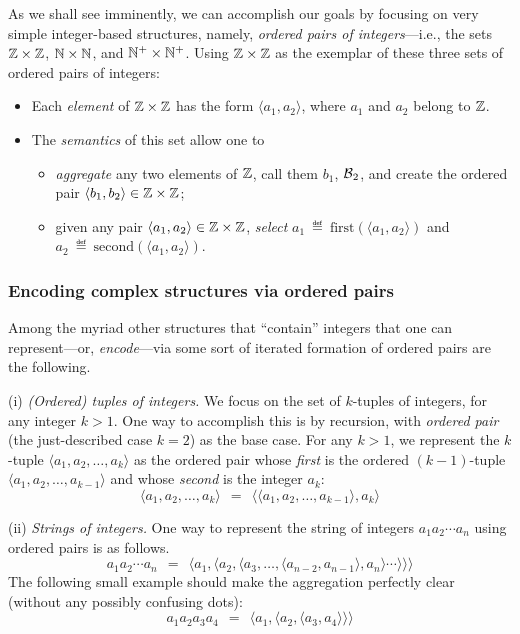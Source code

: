 As we shall see imminently, we can accomplish our goals by focusing on
very simple integer-based structures, namely, {\em ordered pairs of
  integers}---i.e.,
the sets $\mathbb{Z} \times \mathbb{Z}$, $\mathbb{N} \times \mathbb{N}$, and $\mathbb{N}^+ \times \mathbb{N}^+$.
Using $\mathbb{Z} \times \mathbb{Z}$ as the exemplar of these three sets of ordered
pairs of integers:
\begin{itemize}
\item
Each {\em element} of $\mathbb{Z} \times \mathbb{Z}$ has the form $\langle a_1, a_2
\rangle$, where $a_1$ and $a_2$ belong to $\mathbb{Z}$.
\item
The {\em semantics} of this set allow one to
  \begin{itemize}
  \item
{\em aggregate} any two elements of $\mathbb{Z}$, call them $b_1$, $\mbox{$\cal B$}_2$, and
create the ordered pair $\langle b_1, b_2 \rangle \in \mathbb{Z} \times \mathbb{Z}$;
  \item
given any pair $\langle a_1, a_2 \rangle \in \mathbb{Z} \times \mathbb{Z}$, {\em
  select} $a_1 \ \eqdef \ \mbox{first}(\langle a_1, a_2 \rangle)$ and
$a_2 \ \eqdef \ \mbox{second}(\langle a_1, a_2 \rangle)$.
  \end{itemize}
\end{itemize}

\subsubsection{Encoding complex structures via ordered pairs}
\label{sec:encodings-via-ordered-pairs}

Among the myriad other structures that ``contain'' integers that one
can represent---or, {\it encode}---via some sort of iterated formation
of ordered pairs are the following.

\noindent
(i) {\em (Ordered) tuples of integers.}
%
We focus on the set of $k$-tuples of integers, for any integer $k >
1$.  One way to accomplish this is by recursion, with {\em ordered
  pair} (the just-described case $k=2$) as the base case.  For any $k
> 1$, we represent the $k$-tuple $\langle a_1, a_2, \ldots, a_k
\rangle$ as the ordered pair whose {\em first} is the ordered
$(k-1)$-tuple $\langle a_1, a_2, \ldots, a_{k-1} \rangle$ and whose
{\em second} is the integer $a_k$:
\[ \langle a_1, a_2, \ldots, a_k \rangle \ \ = \ \
\langle \langle a_1, a_2, \ldots, a_{k-1} \rangle, a_k \rangle \]

\noindent
(ii) {\em Strings of integers.}
%
One way to represent the string of integers $a_1 a_2 \cdots a_n$ using
ordered pairs is as follows.
\[ a_1 a_2 \cdots a_n \ \ = \ \
\langle a_1, \langle a_2, \langle a_3, \ldots, \langle a_{n-2},  a_{n-1}
\rangle, a_n \rangle \cdots \rangle \rangle \rangle
\]
The following small example should make the aggregation perfectly
clear (without any possibly confusing dots):
\[ a_1 a_2 a_3 a_4 \ \ = \ \
\langle a_1, \langle a_2, \langle a_3,  a_4 \rangle \rangle \rangle
\]

